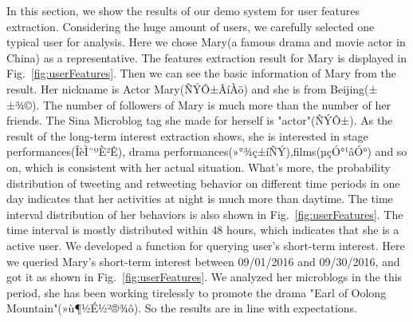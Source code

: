 In this section, we show the results of our demo system for user features extraction.
Considering the huge amount of users, we carefully selected one typical user for analysis.
Here we chose Mary(a famous drama and movie actor in China) as a representative.
The features extraction result for Mary is displayed in Fig.\ \ref{fig:userFeatures}.
Then we can see the basic information of Mary from the result. Her nickname is Actor Mary(ÑÝÔ±ÂíÀö) and she is from Beijing(±±¾©). 
The number of followers of Mary is much more than the number of her friends.
The Sina Microblog tag she made for herself is "actor"(ÑÝÔ±).
As the result of the long-term interest extraction shows, she is interested in stage performances(ÎèÌ¨ºÈ²Ê), drama performances(»°¾ç±íÑÝ),films(µçÓ°¹âÓ°) and so on, which is consistent with her actual situation.
What's more, the probability distribution of tweeting and retweeting behavior on different time periods in one day indicates that her activities at night is much more than daytime.
The time interval distribution of her behaviors is also shown in Fig.\ \ref{fig:userFeatures}. The time interval is mostly distributed within 48 hours, which indicates that she is a active user.
We developed a function for querying user's short-term interest. 
Here we queried Mary's short-term interest between 09/01/2016 and 09/30/2016, and got it as shown in Fig.\ \ref{fig:userFeatures}. We analyzed her microblogs in the this period, she has been working tirelessly to promote the drama "Earl of Oolong Mountain"(»ù¶½É½²®¾ô). So the results are in line with expectations.

